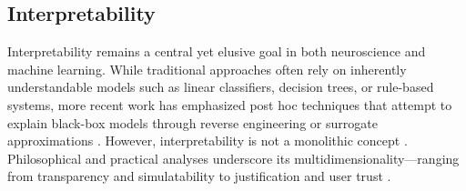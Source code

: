 \documentclass{article}
\theoremstyle{definition} \newtheorem{definition}{Definition}  \newtheorem{example}{Example}
\theoremstyle{remark} \newtheorem{remark}{Remark}
\newcounter{ct}
\begin{document}
\subsection{Interpretability}
Interpretability remains a central yet elusive goal in both neuroscience and machine learning\citep{erasmus2021interpretability}.
While traditional approaches often rely on inherently understandable models such as linear classifiers, decision trees, or rule-based systems, more recent work has emphasized post hoc techniques that attempt to explain black-box models through reverse engineering or surrogate approximations \citep{ehrhardt2017learning, guidotti2018survey}.
However, interpretability is not a monolithic concept \citep{poursabzi2021manipulating,madsen2024interpretability}.
Philosophical and practical analyses underscore its multidimensionality—ranging from transparency and simulatability to justification and user trust \citep{lipton2018mythos,olah2018interpretability, beisbart2022interpretability, raz2024ml, hochstein2022levels, he2024multilevel}.



\end{document}
